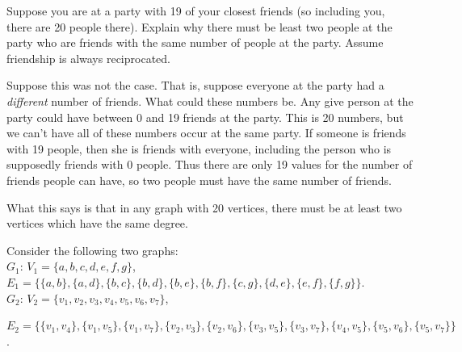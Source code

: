 \begin{questions}
  \question[6] Suppose you are at a party with 19 of your closest friends (so including you, there are 20 people there).  Explain why there must be least two people at the party who are friends with the same number of people at the party.  Assume friendship is always reciprocated.

  \begin{solution}
    Suppose this was not the case.  That is, suppose everyone at the party had a {\em different} number of friends.  What could these numbers be.  Any give person at the party could have between 0 and 19 friends at the party.  This is 20 numbers, but we can't have all of these numbers occur at the same party.  If someone is friends with 19 people, then she is friends with everyone, including the person who is supposedly friends with 0 people.  Thus there are only 19 values for the number of friends people can have, so two people must have the same number of friends.

    What this says is that in any graph with 20 vertices, there must be at least two vertices which have the same degree.
  \end{solution}


  \question[6] Consider the following two graphs:\\
  $G_1$: $V_1=\{a,b,c,d,e,f,g\}$, $E_1=\{\{a,b\},\{a,d\},\{b,c\},\{b,d\},\{b,e\},\{b,f\},\{c,g\},\{d,e\},\{e,f\},\{f,g\}\}$.\\
  $G_2$: $V_2=\{v_1,v_2,v_3,v_4,v_5,v_6,v_7\}$,

  \hspace{1.75em} $E_2=\{\{v_1,v_4\},\{v_1,v_5\},\{v_1,v_7\},\{v_2,v_3\},\{v_2,v_6\},\{v_3,v_5\},\{v_3,v_7\},\{v_4,v_5\},\{v_5,v_6\},\{v_5,v_7\}\}$.
\end{questions}
